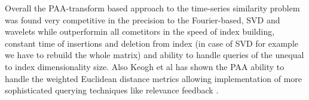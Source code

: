 Overall the PAA-transform based approach to the time-series similarity problem was found very competitive in the precision to the Fourier-based, SVD and wavelets while outperformin all cometitors in the speed of index building, constant time of insertions and deletion from index (in case of SVD for example we have to rebuild the whole matrix) and ability to handle queries of the unequal to index dimensionality size. Also Keogh et al has shown the PAA ability to handle the weighted Euclidean distance metrics allowing implementation of more sophisticated querying techniques like relevance feedback \cite{citeulike:4406444}.
